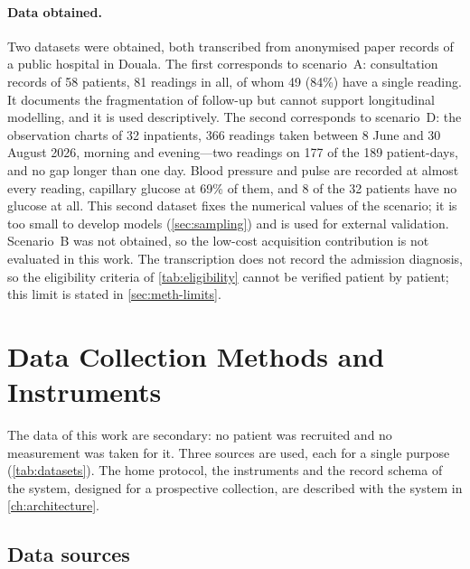 \paragraph{Data obtained.} Two datasets were obtained, both transcribed from anonymised paper records of a public hospital in Douala. The first corresponds to scenario~A: consultation records of 58 patients, 81 readings in all, of whom 49 (84\%) have a single reading. It documents the fragmentation of follow-up but cannot support longitudinal modelling, and it is used descriptively. The second corresponds to scenario~D: the observation charts of 32 inpatients, 366 readings taken between 8 June and 30 August 2026, morning and evening---two readings on 177 of the 189 patient-days, and no gap longer than one day. Blood pressure and pulse are recorded at almost every reading, capillary glucose at 69\% of them, and 8 of the 32 patients have no glucose at all. This second dataset fixes the numerical values of the scenario; it is too small to develop models (\cref{sec:sampling}) and is used for external validation. Scenario~B was not obtained, so the low-cost acquisition contribution is not evaluated in this work. The transcription does not record the admission diagnosis, so the eligibility criteria of \cref{tab:eligibility} cannot be verified patient by patient; this limit is stated in \cref{sec:meth-limits}.

\section{Data Collection Methods and Instruments}\label{sec:data-collection}\label{sec:collection}

The data of this work are secondary: no patient was recruited and no measurement was taken for it. Three sources are used, each for a single purpose (\cref{tab:datasets}). The home protocol, the instruments and the record schema of the system, designed for a prospective collection, are described with the system in \cref{ch:architecture}.

\subsection{Data sources}\label{sec:datasets}

